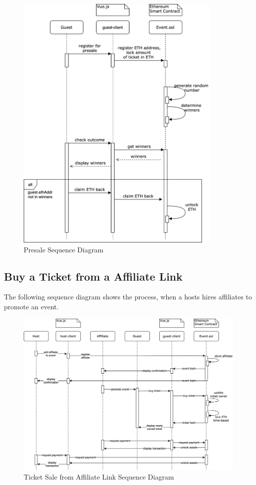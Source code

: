 \begin{figure}[H]
    \centering
    \includegraphics[width=10cm]{design/diagrams/presale.png}
    \caption{Presale Sequence Diagram}
    \label{fig:presale-seuquence-diagram}
\end{figure}

\subsection{Buy a Ticket from a Affiliate Link}
The following sequence diagram shows the process, when a hosts hires affiliates to promote an event.
\begin{figure}[H]
    \centering
    \includegraphics[width=16cm]{design/diagrams/BuyTicketFromAffiliateLink.png}
    \caption{Ticket Sale from Affiliate Link Sequence Diagram}
    \label{fig:buyticket-from-affiliate-diagram}
\end{figure}

